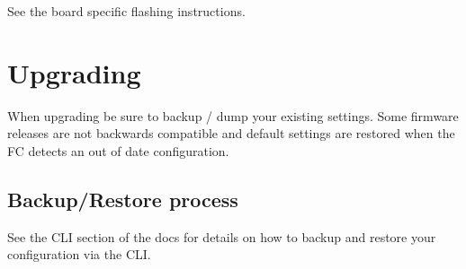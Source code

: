 See the board specific flashing instructions.

\section*{Upgrading}

When upgrading be sure to backup / dump your existing settings. Some firmware releases are not backwards compatible and default settings are restored when the F\+C detects an out of date configuration.

\subsection*{Backup/\+Restore process}

See the C\+L\+I section of the docs for details on how to backup and restore your configuration via the C\+L\+I. 